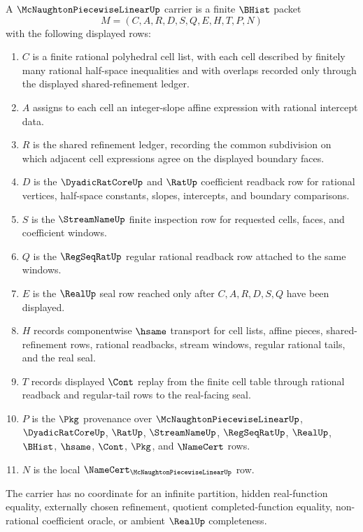 \begin{definition}
\label{def:mcnaughton-piecewise-linear-carrier}
A $\McNaughtonPiecewiseLinearUp$ carrier is a finite $\BHist$ packet
$$
M=(C,A,R,D,S,Q,E,H,T,P,N)
$$
with the following displayed rows:
\begin{enumerate}
\item $C$ is a finite rational polyhedral cell list, with each cell described by finitely many rational half-space inequalities and with overlaps recorded only through the displayed shared-refinement ledger.
\item $A$ assigns to each cell an integer-slope affine expression with rational intercept data.
\item $R$ is the shared refinement ledger, recording the common subdivision on which adjacent cell expressions agree on the displayed boundary faces.
\item $D$ is the $\DyadicRatCoreUp$ and $\RatUp$ coefficient readback row for rational vertices, half-space constants, slopes, intercepts, and boundary comparisons.
\item $S$ is the $\StreamNameUp$ finite inspection row for requested cells, faces, and coefficient windows.
\item $Q$ is the $\RegSeqRatUp$ regular rational readback row attached to the same windows.
\item $E$ is the $\RealUp$ seal row reached only after $C,A,R,D,S,Q$ have been displayed.
\item $H$ records componentwise $\hsame$ transport for cell lists, affine pieces, shared-refinement rows, rational readbacks, stream windows, regular rational tails, and the real seal.
\item $T$ records displayed $\Cont$ replay from the finite cell table through rational readback and regular-tail rows to the real-facing seal.
\item $P$ is the $\Pkg$ provenance over $\McNaughtonPiecewiseLinearUp$, $\DyadicRatCoreUp$, $\RatUp$, $\StreamNameUp$, $\RegSeqRatUp$, $\RealUp$, $\BHist$, $\hsame$, $\Cont$, $\Pkg$, and $\NameCert$ rows.
\item $N$ is the local $\NameCert_{\McNaughtonPiecewiseLinearUp}$ row.
\end{enumerate}
The carrier has no coordinate for an infinite partition, hidden real-function equality, externally chosen refinement, quotient completed-function equality, non-rational coefficient oracle, or ambient $\RealUp$ completeness.
\end{definition}

